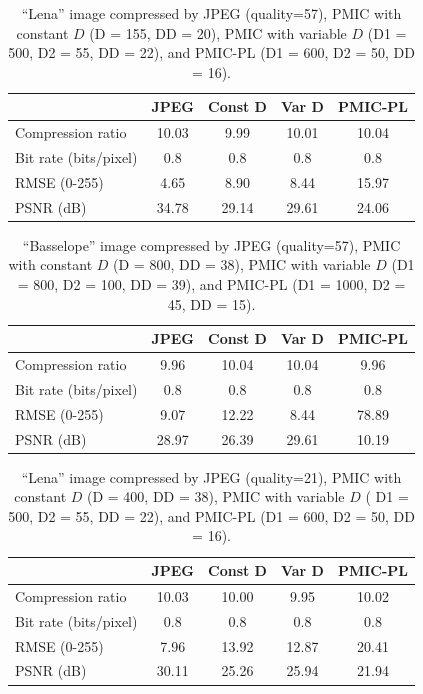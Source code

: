\documentclass[11pt,a4paper]{article}
\newcommand{\parsec}{\par\noindent}
\newcommand{\med}{\medskip\parsec}
\begin{document}
\begin{table}[htbp]
\caption{``Lena'' image compressed by JPEG (quality=57), PMIC with
constant $D$ (D = 155, DD = 20), PMIC with variable $D$
(D1 = 500, D2 = 55, DD = 22), and PMIC-PL (D1 = 600, D2 = 50, DD = 16).}

\begin{center}
\begin{tabular}{|l|c|c|c|c|} \hline
& JPEG & Const D & Var D & PMIC-PL\\ \hline
Compression ratio & 10.03 & 9.99 & 10.01 & 10.04\\ \hline
Bit rate (bits/pixel) & 0.8 & 0.8 & 0.8 & 0.8\\ \hline
RMSE (0-255) & 4.65 & 8.90 & 8.44 & 15.97\\ \hline
PSNR (dB) & 34.78 & 29.14 & 29.61 & 24.06\\ \hline
\end{tabular}
\end{center}
\end{table}

\begin{table}[htbp]
\caption{``Basselope'' image compressed by JPEG (quality=57), PMIC with
constant $D$ (D = 800, DD = 38), PMIC with variable $D$
(D1 = 800, D2 = 100, DD = 39), and PMIC-PL (D1 = 1000, D2 = 45, DD = 15).}

\begin{center}
\begin{tabular}{|l|c|c|c|c|} \hline
& JPEG & Const D & Var D & PMIC-PL\\ \hline
Compression ratio & 9.96 & 10.04 & 10.04 & 9.96\\ \hline
Bit rate (bits/pixel) & 0.8 & 0.8 & 0.8 & 0.8\\ \hline
RMSE (0-255) & 9.07 & 12.22 & 8.44 & 78.89\\ \hline
PSNR (dB) & 28.97 & 26.39 & 29.61 & 10.19\\ \hline
\end{tabular}
\end{center}
\end{table}

\begin{table}[htbp]
\caption{``Lena'' image compressed by JPEG (quality=21), PMIC with
constant $D$ (D = 400, DD = 38), PMIC with variable $D$ 
( D1 = 500, D2 = 55, DD = 22), and PMIC-PL (D1 = 600, D2 = 50, DD = 16).}
\med
\begin{center}
\begin{tabular}{|l|c|c|c|c|} \hline
& JPEG & Const D & Var D & PMIC-PL\\ \hline
Compression ratio & 10.03 & 10.00 & 9.95 & 10.02\\ \hline
Bit rate (bits/pixel) & 0.8 & 0.8 & 0.8 & 0.8\\ \hline
RMSE (0-255) & 7.96 & 13.92 & 12.87 & 20.41\\ \hline
PSNR (dB) & 30.11 & 25.26 & 25.94 & 21.94\\ \hline
\end{tabular}
\end{center}
\end{table}
\end{document}
